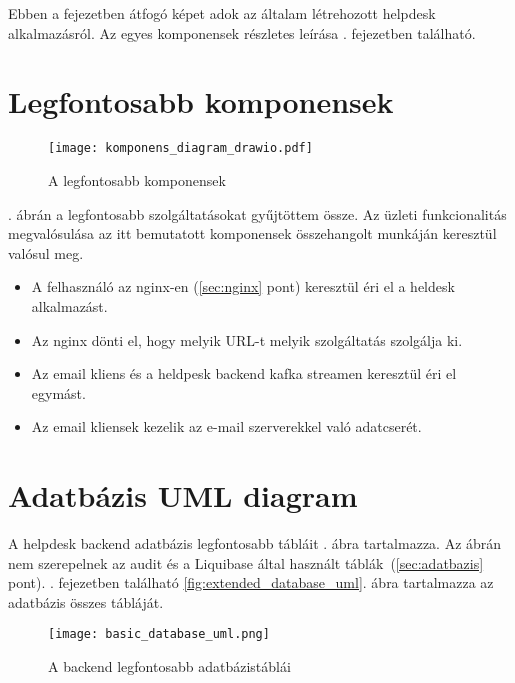 Ebben a fejezetben átfogó képet adok az általam létrehozott helpdesk alkalmazásról. Az egyes komponensek részletes leírása . fejezetben található.

\section{Legfontosabb komponensek}

\begin{figure}[hbt] 
	\centering
	\texttt{[image: komponens\_diagram\_drawio.pdf]}
	\caption{A legfontosabb komponensek}
	\label{fig:komponens_diagram}
\end{figure}

. ábrán a legfontosabb szolgáltatásokat gyűjtöttem össze. Az üzleti funkcionalitás megvalósulása az itt bemutatott komponensek összehangolt munkáján keresztül valósul meg.



\begin{itemize}
	\item A felhasználó az nginx-en (\ref{sec:nginx} pont) keresztül éri el a heldesk alkalmazást.
	\item Az nginx dönti el, hogy melyik URL-t melyik szolgáltatás szolgálja ki.
	\item Az email kliens és a heldpesk backend kafka streamen keresztül éri el egymást.
	\item Az email kliensek kezelik az e-mail szerverekkel való adatcserét.
\end{itemize}


\section{Adatbázis UML diagram}
A helpdesk backend adatbázis legfontosabb tábláit . ábra tartalmazza. Az ábrán nem szerepelnek az audit és a Liquibase által használt táblák~(\ref{sec:adatbazis} pont). . fejezetben található \ref{fig:extended_database_uml}. ábra tartalmazza az adatbázis összes tábláját.
 


\begin{figure}[hbt] 
	\centering
	\texttt{[image: basic\_database\_uml.png]}
	\caption{A backend legfontosabb adatbázistáblái}
	\label{fig:basic_database_uml}
\end{figure}

